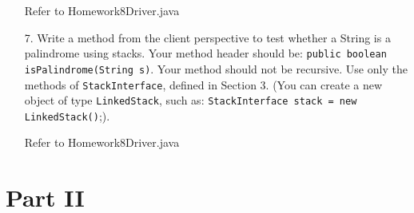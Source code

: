 \documentclass[10pt]{article}
\begin{document}
\begin{enumerate}
			\vspace{0.5cm}
			Refer to Homework8Driver.java
			\vspace{0.5cm}
		
		\item[7.] Write a method from the client perspective to test whether a String is a palindrome using stacks. Your method header should be: \texttt{public boolean isPalindrome(String s)}. Your method should not be recursive. Use only the methods of \texttt{StackInterface}, defined in Section 3. (You can create a new object of type \texttt{LinkedStack}, such as: \texttt{StackInterface stack = new LinkedStack()};).
			
			\vspace{0.5cm}
			Refer to Homework8Driver.java
			\vspace{0.5cm}
			
	\end{enumerate}

\section{Part II}
	
\end{document}
